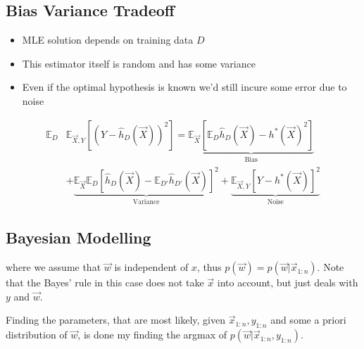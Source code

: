 \documentclass[10pt,a4paper]{scrartcl}
\newcommand{\Argmin}[2]{\text{arg}\underset{#1}{\min}\left(#2\right)}
\begin{document}
\begin{multicols*}{2}
\subsection{Bias Variance Tradeoff}


\begin{itemize}
\item MLE solution depends on training data $D$

\mportant{$\hat{h}=\hat{h}_D=\Argmin{h\in\mathcal{H}}{\sum\limits_{(\vec{x},y)\in D}(y-h(\vec{x}))^2}$}
\item This estimator itself is random and has some variance


\item Even if the optimal hypothesis is known we'd still incure some error due to noise

\end{itemize}

\begin{align*}
\mathbb{E}_D&\mathbb{E}_{\vec{X},Y}\left[(Y-\hat{h}_D(\vec{X}))^2\right]=\underbrace{\mathbb{E}_{\vec{X}}\left[\mathbb{E}_D\hat{h}_D(\vec{X})-h^\ast(\vec{X})^2\right]}_{\text{Bias}}\\
&+\underbrace{\mathbb{E}_{\vec{X}}\mathbb{E}_D\left[\hat{h}_D(\vec{X})-\mathbb{E}_{D'}\hat{h}_{D'}(\vec{X})\right]^2}_{\text{Variance}}+\underbrace{\mathbb{E}_{\vec{X},Y}\left[Y-h^\ast(\vec{X})\right]^2}_{\text{Noise}}
\end{align*}

\subsection{Bayesian Modelling}


where we assume that $\vec{w}$ is independent of $x$, thus $p(\vec{w})=p(\vec{w}|\vec{x}_{1:n})$. Note that the Bayes' rule in this case does not take $\vec{x}$ into account, but just deals with $y$ and $\vec{w}$.

Finding the parameters, that are most likely, given $\vec{x}_{1:n}, y_{1:n}$ and some a priori distribution of $\vec{w}$, is done my finding the argmax of $p(\vec{w}|\vec{x}_{1:n},y_{1:n})$.


\end{multicols*}
\end{document}
